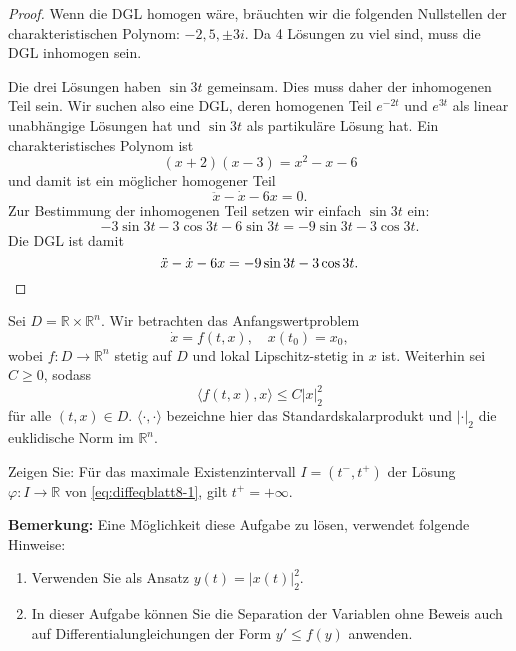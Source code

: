 \begin{proof}
	Wenn die DGL homogen wäre, bräuchten wir die folgenden Nullstellen der charakteristischen Polynom: $-2, 5, \pm 3i$. Da 4 L\"{o}sungen zu viel sind, muss die DGL inhomogen sein.

	Die drei L\"{o}sungen haben $\sin 3t$ gemeinsam. Dies muss daher der inhomogenen Teil sein. Wir suchen also eine DGL, deren homogenen Teil $e^{-2t}$ und $e^{3t}$ als linear unabhängige Lösungen hat und $\sin 3t$ als partikuläre Lösung hat. Ein charakteristisches Polynom ist
	\[
		(x+2)(x-3) = x^2 - x - 6
	\]
	und damit ist ein möglicher homogener Teil
	\[
		\ddot{x}-\dot{x}-6x=0
	.\] 
	Zur Bestimmung der inhomogenen Teil setzen wir einfach $\sin 3t$ ein:
	\[
	-3 \sin 3t - 3 \cos 3t - 6\sin 3t = -9\sin 3t - 3 \cos 3t
	.\] 
	Die DGL ist damit
	\[
		\ddot{x}-\dot{x}-6x = -9\sin 3t - 3 \cos 3t
	.\qedhere\] 
\end{proof}
\begin{Problem}
	Sei $D = \mathbb{R} \times \mathbb{R}^n$. Wir betrachten das Anfangswertproblem
	\begin{equation}\label{eq:diffeqblatt8-1}
		\dot{x} = f(t, x), \quad x(t_0) = x_0, \tag{1}
	\end{equation}
	wobei $f : D \to \mathbb{R}^n$ stetig auf $D$ und lokal Lipschitz-stetig in $x$ ist. Weiterhin sei $C \geq 0$, sodass
	\[
	\langle f(t, x), x \rangle \leq C|x|_2^2
	\]
	für alle $(t, x) \in D$. $\langle \cdot, \cdot \rangle$ bezeichne hier das Standardskalarprodukt und $|\cdot|_2$ die euklidische Norm im $\mathbb{R}^n$.
	
	Zeigen Sie: Für das maximale Existenzintervall $I = (t^-, t^+)$ der Lösung $\varphi : I \to \mathbb{R}$ von \eqref{eq:diffeqblatt8-1}, gilt $t^+ = +\infty$.
	
	\textbf{Bemerkung:} Eine Möglichkeit diese Aufgabe zu lösen, verwendet folgende Hinweise:
	\begin{enumerate}
		\item Verwenden Sie als Ansatz $y(t) = |x(t)|_2^2$.
		\item In dieser Aufgabe können Sie die Separation der Variablen ohne Beweis auch auf Differentialungleichungen der Form $y' \leq f(y)$ anwenden.
	\end{enumerate}
	\end{Problem}
	
	\newpage

